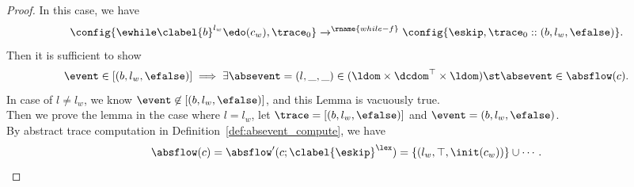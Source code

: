 \begin{proof}
    In this case, we have
    \[
      \config{{\ewhile \clabel{b}^{l_w} \edo (c_w), \trace_0}}
      \xrightarrow{}^\rname{while-f}
      \config{{
      \eskip,
      \trace_0 :: (b, l_w, \efalse)}}.
    \]
    Then it is sufficient to show
      \[
        \event \in [(b, l_w, \efalse)]
        \implies
        \exists \absevent = (l, \_, \_) \in (\ldom\times \dcdom^{\top} \times \ldom) \st 
        \absevent \in \absflow(c).
      \]
      In case of $l \neq l_w$, we know $\event \not\in [(b, l_w, \efalse)]$, and this Lemma is vacuously true.
      \\
      Then we prove the lemma in the case where $l = l_w$, 
      let $\trace = [(b, l_w, \efalse)]$ and $\event = (b, l_w, \efalse)$.
    \\
    By abstract trace computation in Definition~\ref{def:absevent_compute}, we have
    \[
      \absflow(c) = \absflow'(c; \clabel{\eskip}^{\lex}) = \{(l_w, \top, \init(c_w))\} \cup \cdots.
\]
\end{proof}
